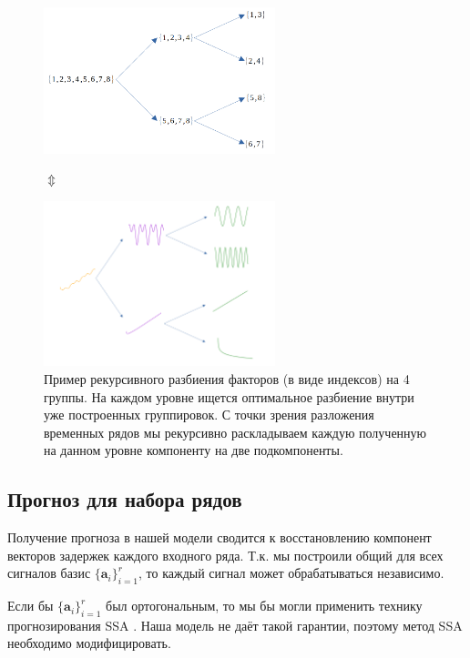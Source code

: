 	    	\begin{figure}[h!]
	    		\centering
	    		\includegraphics[width=0.6\textwidth, keepaspectratio]{../figs/dichotomy_drawings/factors.png}    
	    		
	    		$ \Updownarrow $
	    				
	    		\includegraphics[width=0.6\textwidth, keepaspectratio]{../figs/dichotomy_drawings/signals.png}	
	    		
	    		\caption{Пример рекурсивного разбиения факторов (в виде индексов) на 4 группы. На каждом уровне ищется оптимальное разбиение внутри уже построенных группировок. С точки зрения разложения временных рядов мы рекурсивно раскладываем каждую полученную на данном уровне компоненту на две подкомпоненты.}\label{pic:decomp_conception}
	    	\end{figure}
	    	
	    \subsection*{Прогноз для набора рядов}
	     
	    	Получение прогноза в нашей модели сводится к восстановлению компонент векторов задержек каждого входного ряда. Т.к. мы построили общий для всех сигналов базис $ \{\mathbf{a}_i\}_{i = 1}^r $, то каждый сигнал может обрабатываться независимо.
	    	
	    	Если бы $ \{\mathbf{a}_i\}_{i = 1}^r $ был ортогональным, то мы бы могли применить технику прогнозирования SSA \cite{ecfb9dc578be43ae9ee8fc88b8ff9151}. Наша модель не даёт такой гарантии, поэтому метод SSA необходимо модифицировать.
	    	
